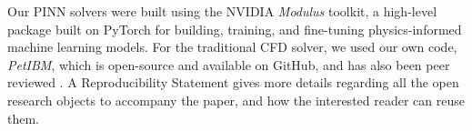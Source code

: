 Our PINN solvers were built using the NVIDIA \emph{Modulus} toolkit, a high-level package built on PyTorch for building, training, and fine-tuning physics-informed machine learning models.
For the traditional CFD solver, we used our own code, \emph{PetIBM}, which is open-source and available on GitHub, and has also been peer reviewed \cite{chuang_petibm_2018}. 
A Reproducibility Statement gives more details regarding all the open research objects to accompany the paper, and how the interested reader can reuse them.

\clearpage